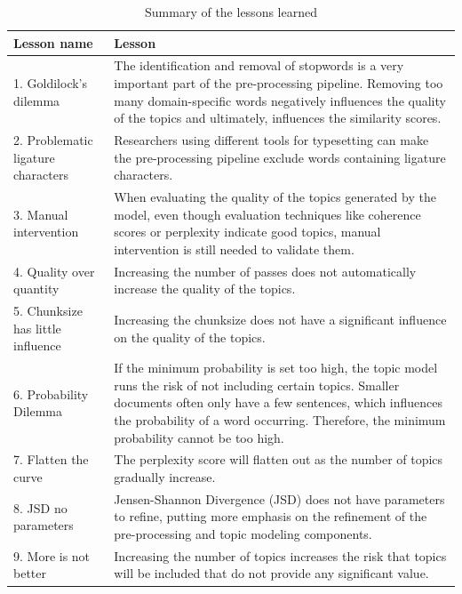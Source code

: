 \begin{table}[htb]
\begin{tabularx}{\textwidth}{|l|X|}
\hline
\textbf{Lesson name} & \textbf{Lesson} \\ \hline
1. Goldilock's dilemma & The identification and removal of stopwords is a very important part of the pre-processing pipeline. Removing too many domain-specific words negatively influences the quality of the topics and ultimately, influences the similarity scores. \\ \hline
2. Problematic ligature characters & Researchers using different tools for typesetting can make the pre-processing pipeline exclude words containing ligature characters. \\ \hline
3. Manual intervention & When evaluating the quality of the topics generated by the model, even though evaluation techniques like coherence scores or perplexity indicate good topics, manual intervention is still needed to validate them. \\ \hline
4. Quality over quantity & Increasing the number of passes does not automatically increase the quality of the topics. \\ \hline
5. Chunksize has little influence & Increasing the chunksize does not have a significant influence on the quality of the topics. \\ \hline
6. Probability Dilemma & If the minimum probability is set too high, the topic model runs the risk of not including certain topics. Smaller documents often only have a few sentences, which influences the probability of a word occurring. Therefore, the minimum probability cannot be too high. \\ \hline
7. Flatten the curve & The perplexity score will flatten out as the number of topics gradually increase. \\ \hline
8. JSD no parameters & Jensen-Shannon Divergence (JSD) does not have parameters to refine, putting more emphasis on the refinement of the pre-processing and topic modeling components. \\ \hline
9. More is not better & Increasing the number of topics increases the risk that topics will be included that do not provide any significant value. \\ \hline
\end{tabularx}
\caption{Summary of the lessons learned}
\label{tab:lessons}
\end{table}
 
